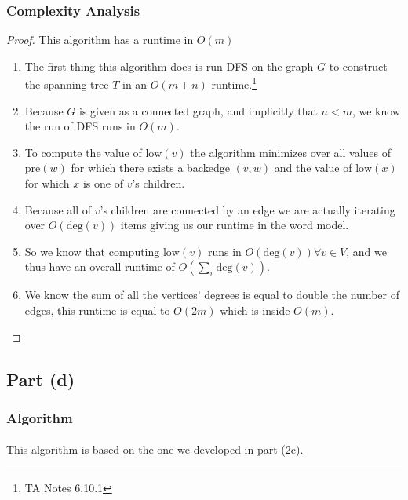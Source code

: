 \documentclass{article}
\begin{document}
\subsubsection{Complexity Analysis}
\begin{proof} This algorithm has a runtime in \(O(m)\)
      \begin{enumerate}
            \item The first thing this algorithm does is run DFS on the graph \(G\) to
                  construct the spanning tree \(T\) in an \(O(m+n)\) runtime.\footnote{TA Notes 6.10.1}
            \item Because \(G\) is given as a connected graph, and implicitly that \(n <
                  m\), we know the run of DFS runs in \(O(m)\).
            \item To compute the value of \(\text{low}(v)\) the algorithm minimizes over
                  all values of \(\text{pre}(w)\) for which there exists a backedge \((v, w)\)
                  and the value of \(\text{low}(x)\) for which \(x\) is one of \(v\)'s children.
            \item Because all of \(v\)'s children are connected by an edge we are actually
                  iterating over \( O( \text{deg}(v) ) \) items giving us our runtime in the word
                  model.
            \item So we know that computing \( \text{low}(v) \) runs in \( O(
                  \text{deg}(v) ) \forall v \in V\), and we thus have an overall runtime of
                  \( O( \sum_{v}{ \text{deg}(v) } ) \).
            \item We know the sum of all the vertices' degrees is equal to double the
                  number of edges, this runtime is equal to \(O(2m)\) which is inside \(O(m)\).
      \end{enumerate}
\end{proof}

\subsection{Part (d)}
\subsubsection{Algorithm}
\paragraph{}
This algorithm is based on the one we developed in part (2c).
\end{document}
